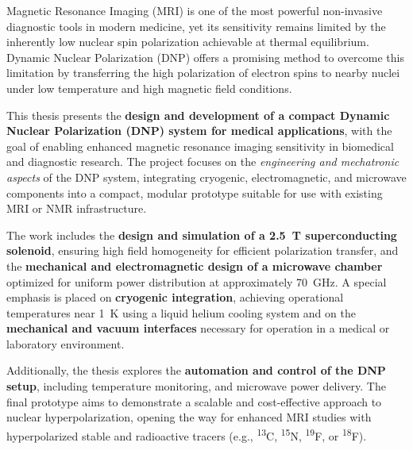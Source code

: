 \documentclass[FM,DP,EN,twoside]{tulthesis}
\begin{document}

\clearpage
\newpage
\thispagestyle{empty}
\mbox{}
\newpage

\clearpage
\newpage
\thispagestyle{empty}
\mbox{}
\newpage

\begin{abstractCZ}

\end{abstractCZ}

\begin{keywordsCZ} 

\end{keywordsCZ}
\thispagestyle{empty}
\vspace{2cm}

\clearpage
\newpage
\thispagestyle{empty}
\mbox{}
\newpage
\thispagestyle{empty}
\begin{abstractEN}
Magnetic Resonance Imaging (MRI) is one of the most powerful non-invasive diagnostic tools in modern medicine, yet its sensitivity remains limited by the inherently low nuclear spin polarization achievable at thermal equilibrium. Dynamic Nuclear Polarization (DNP) offers a promising method to overcome this limitation by transferring the high polarization of electron spins to nearby nuclei under low temperature and high magnetic field conditions.

This thesis presents the \textbf{design and development of a compact Dynamic Nuclear Polarization (DNP) system for medical applications}, with the goal of enabling enhanced magnetic resonance imaging sensitivity in biomedical and diagnostic research. The project focuses on the \textit{engineering and mechatronic aspects} of the DNP system, integrating cryogenic, electromagnetic, and microwave components into a compact, modular prototype suitable for use with existing MRI or NMR infrastructure.

The work includes the \textbf{design and simulation of a 2.5~T superconducting solenoid}, ensuring high field homogeneity for efficient polarization transfer, and the \textbf{mechanical and electromagnetic design of a microwave chamber} optimized for uniform power distribution at approximately 70~GHz. A special emphasis is placed on \textbf{cryogenic integration}, achieving operational temperatures near 1~K using a liquid helium cooling system and on the \textbf{mechanical and vacuum interfaces} necessary for operation in a medical or laboratory environment.

Additionally, the thesis explores the \textbf{automation and control of the DNP setup}, including temperature monitoring, and microwave power delivery. The final prototype aims to demonstrate a scalable and cost-effective approach to nuclear hyperpolarization, opening the way for enhanced MRI studies with hyperpolarized stable and radioactive tracers (e.g., \textsuperscript{13}C, \textsuperscript{15}N, \textsuperscript{19}F, or \textsuperscript{18}F).

\end{abstractEN}
\end{document}
